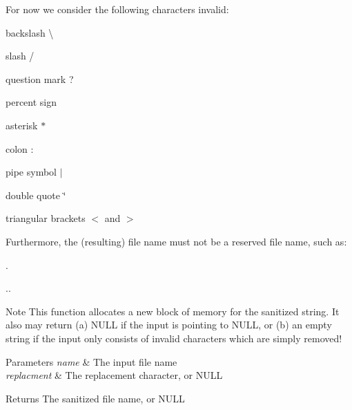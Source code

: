 For now we consider the following characters invalid\+:
\begin{DoxyItemize}
\item backslash \textquotesingle{}\textbackslash{}\textquotesingle{}
\item slash \textquotesingle{}/\textquotesingle{}
\item question mark \textquotesingle{}?\textquotesingle{}
\item percent sign \textquotesingle{}\textquotesingle{}
\item asterisk \textquotesingle{}$\ast$\textquotesingle{}
\item colon \textquotesingle{}\+:\textquotesingle{}
\item pipe symbol \textquotesingle{}$\vert$\textquotesingle{}
\item double quote \textquotesingle{}\char`\"{}\textquotesingle{}
\item triangular brackets \textquotesingle{}$<$\textquotesingle{} and \textquotesingle{}$>$\textquotesingle{}
\end{DoxyItemize}

Furthermore, the (resulting) file name must not be a reserved file name, such as\+:
\begin{DoxyItemize}
\item \textquotesingle{}.\textquotesingle{}
\item \textquotesingle{}..\textquotesingle{}
\end{DoxyItemize}

\begin{DoxyNote}{Note}
This function allocates a new block of memory for the sanitized string. It also may return (a) N\+U\+LL if the input is pointing to N\+U\+LL, or (b) an empty string if the input only consists of invalid characters which are simply removed!
\end{DoxyNote}

\begin{DoxyParams}{Parameters}
{\em name} & The input file name \\
\hline
{\em replacment} & The replacement character, or N\+U\+LL \\
\hline
\end{DoxyParams}
\begin{DoxyReturn}{Returns}
The sanitized file name, or N\+U\+LL 
\end{DoxyReturn}
